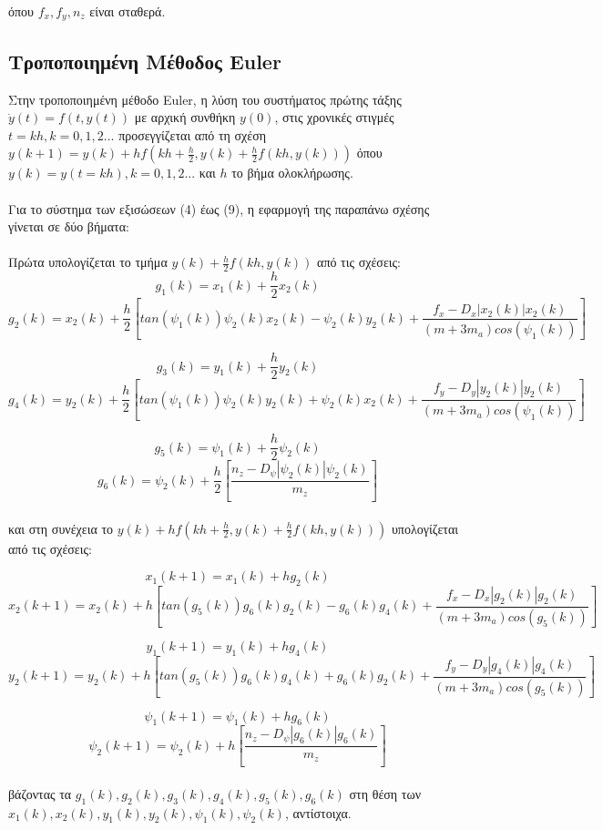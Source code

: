 \documentclass{article}
\begin{document}
όπου \(f_x, f_y, n_z\) είναι σταθερά.
\subsection{Τροποποιημένη Μέθοδος Euler}
Στην τροποποιημένη μέθοδο Euler, η λύση του συστήματος πρώτης τάξης \(\dot{y}(t) = f(t, y(t))\) με αρχική συνθήκη \(y(0)\), στις χρονικές στιγμές \(t = kh, k = 0, 1, 2...\) προσεγγίζεται από τη σχέση \(y(k+1) = y(k) + hf(kh + \frac{h}{2}, y(k) + \frac{h}{2}f(kh, y(k)))\) όπου \(y(k) = y(t = kh), k = 0, 1, 2...\) και \(h\) το βήμα ολοκλήρωσης.
\\\\
Για το σύστημα των εξισώσεων (4) έως (9), η εφαρμογή της παραπάνω σχέσης γίνεται σε δύο βήματα:
\\\\
Πρώτα υπολογίζεται το τμήμα \(y(k) + \frac{h}{2}f(kh, y(k))\) από τις σχέσεις: 
\[g_1(k) = x_1(k) + \frac{h}{2}x_2(k)\]
\[g_2(k) = x_2(k) + \frac{h}{2}[tan(\psi_1(k))\psi_2(k)x_2(k) - \psi_2(k)y_2(k) + \frac{f_x - D_x|x_2(k)|x_2(k)}{(m + 3m_a)cos(\psi_1(k))}]\]

\[ g_3(k)   = y_1(k) + \frac{h}{2}y_2(k)   \]
\[g_4(k) = y_2(k) + \frac{h}{2}[tan(\psi_1(k))\psi_2(k)y_2(k) + \psi_2(k)x_2(k) + \frac{f_y - D_y|y_2(k)|y_2(k)}{(m + 3m_a)cos(\psi_1(k))}]\]


\[ g_5(k)   = \psi_1(k) + \frac{h}{2}\psi_2(k)   \]
\[ g_6(k) = \psi_2(k) + \frac{h}{2}[\frac{n_z - D_\psi|\psi_2(k)|\psi_2(k)}{m_z}]\]
\\
και στη συνέχεια το \(y(k) + hf(kh + \frac{h}{2}, y(k) + \frac{h}{2}f(kh, y(k)))\) υπολογίζεται από τις σχέσεις:

\[x_1(k+1) = x_1(k) + hg_2(k)\]
\[x_2(k+1) = x_2(k) + h[tan(g_5(k))g_6(k)g_2(k) - g_6(k)g_4(k) + \frac{f_x - D_x|g_2(k)|g_2(k)}{(m + 3m_a)cos(g_5(k))}]\]

\[ y_1(k+1)   = y_1(k) + hg_4(k)   \]
\[y_2(k+1) = y_2(k) + h[tan(g_5(k))g_6(k)g_4(k) + g_6(k)g_2(k) + \frac{f_y - D_y|g_4(k)|g_4(k)}{(m + 3m_a)cos(g_5(k))}]\]


\[ \psi_1(k+1)   = \psi_1(k) + hg_6(k)   \]
\[ \psi_2(k+1) = \psi_2(k) + h[\frac{n_z - D_\psi|g_6(k)|g_6(k)}{m_z}]\]
\\
βάζοντας τα \(g_1(k), g_2(k), g_3(k), g_4(k), g_5(k), g_6(k)\) στη θέση των \(x_1(k), x_2(k), y_1(k), y_2(k), \psi_1(k), \psi_2(k)\), αντίστοιχα.
\end{document}
